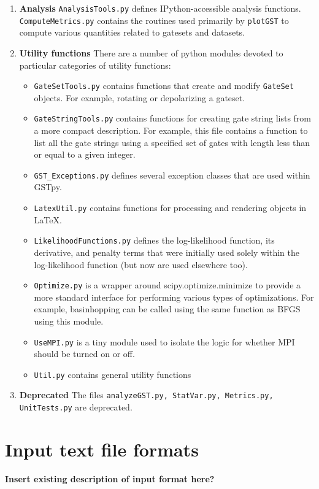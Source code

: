 \documentclass{article}[11pt]
\begin{document}
\begin{enumerate}
\item \textbf{Analysis}  \texttt{AnalysisTools.py} defines IPython-accessible analysis functions. \texttt{ComputeMetrics.py} contains the routines used primarily by \texttt{plotGST} to compute various quantities related to gatesets and datasets.

\item \textbf{Utility functions} There are a number of python modules devoted to particular categories of utility functions:
  \begin{itemize}
    \item \texttt{GateSetTools.py} contains functions that create and modify \texttt{GateSet} objects.  For example, rotating or depolarizing a gateset.
    \item \texttt{GateStringTools.py} contains functions for creating gate string lists from a more compact description.  For example, this file contains a function to list all the gate strings using a specified set of gates with length less than or equal to a given integer.
    \item \texttt{GST\_Exceptions.py} defines several exception classes that are used within GSTpy.
    \item \texttt{LatexUtil.py} contains functions for processing and rendering objects in LaTeX.
    \item \texttt{LikelihoodFunctions.py} defines the log-likelihood function, its derivative, and penalty terms that were initially used solely within the log-likelihood function (but now are used elsewhere too).
    \item \texttt{Optimize.py} is a wrapper around scipy.optimize.minimize to provide a more standard interface for performing various types of optimizations.  For example, basinhopping can be called using the same function as BFGS using this module.
    \item \texttt{UseMPI.py} is a tiny module used to isolate the logic for whether MPI should be turned on or off.
    \item \texttt{Util.py} contains general utility functions
  \end{itemize}

\item \textbf{Deprecated} The files \texttt{analyzeGST.py, StatVar.py, Metrics.py, UnitTests.py} are deprecated.

\end{enumerate}

\section{Input text file formats\label{secInputFormats}}
\textbf{Insert existing description of input format here?}
\end{document}
